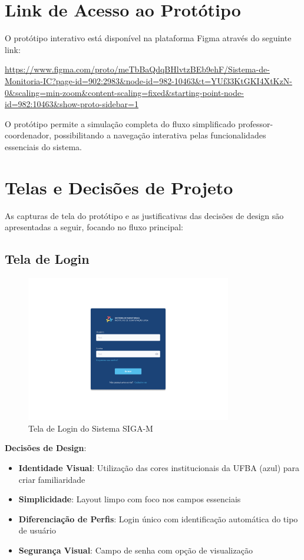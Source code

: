 \documentclass[12pt, a4paper]{report}
\begin{document}
\section{Link de Acesso ao Protótipo}

O protótipo interativo está disponível na plataforma Figma através do seguinte link:

\url{https://www.figma.com/proto/meTbBaQdqBHlvtzBEb9ehF/Sistema-de-Monitoria-IC?page-id=902:2983&node-id=982-10463&t=YUf33KtGKI4XtKzN-0&scaling=min-zoom&content-scaling=fixed&starting-point-node-id=982:10463&show-proto-sidebar=1}

O protótipo permite a simulação completa do fluxo simplificado professor-coordenador, possibilitando a navegação interativa pelas funcionalidades essenciais do sistema.

\section{Telas e Decisões de Projeto}

As capturas de tela do protótipo e as justificativas das decisões de design são apresentadas a seguir, focando no fluxo principal:

\subsection{Tela de Login}

\begin{figure}[H]
\centering
\includegraphics[width=0.8\textwidth]{figma/Login.png}
\caption{Tela de Login do Sistema SIGA-M}
\label{fig:login}
\end{figure}

\textbf{Decisões de Design}:
\begin{itemize}
    \item \textbf{Identidade Visual}: Utilização das cores institucionais da UFBA (azul) para criar familiaridade
    \item \textbf{Simplicidade}: Layout limpo com foco nos campos essenciais
    \item \textbf{Diferenciação de Perfis}: Login único com identificação automática do tipo de usuário
    \item \textbf{Segurança Visual}: Campo de senha com opção de visualização
\end{itemize}
\end{document}
